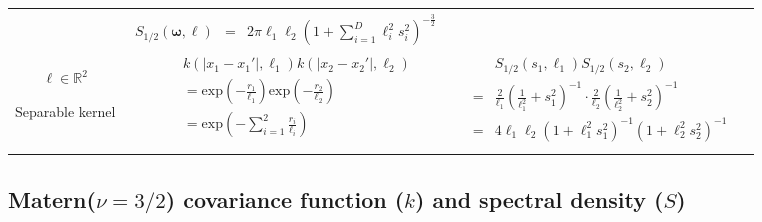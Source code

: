 \documentclass[onecolumn,a4paper,11pt]{article}
\begin{document}
\begin{landscape}
\begin{table}[H]
\begin{center}
\begin{tabular}{|c|c|c|c|}
       & \multicolumn{1}{|p{9.7cm}|}{\small
         \begin{eqnarray*}
		S_{1/2}(\bm{\omega},\bm{\ell}) &=& 2\pi\ell_1\ell_2 \left(1+\sum_{i=1}^{D}\ell_i^2s_{i}^2\right)^{-\frac{3}{2}}
         \end{eqnarray*}
       }
       
       & \multicolumn{1}{|p{5.7cm}|}{\small

       } \\  
       
       \cline{1-3}
       
       \multicolumn{1}{|p{1.5cm}|}{
       \vspace{1mm}
       $\bm{\ell} \in \mathbb{R}^2$
       
       {Separable kernel} 
       }
       
        & \multicolumn{1}{|p{5.7cm}|}{\small
         \begin{eqnarray*}
		&&k(|x_1-x_1'|,\ell_1)k(|x_2-x_2'|,\ell_2) \\
		&&= \mathrm{exp}\left(- \frac{r_1}{\ell_1} \right) \mathrm{exp}\left(- \frac{r_2}{\ell_2} \right) \\
		&&= \mathrm{exp}\left(- \sum_{i=1}^{2}\frac{r_i}{\ell_i} \right)
         \end{eqnarray*}
       }
       
       & \multicolumn{1}{|p{9.7cm}|}{\small
         \begin{eqnarray*}
         &&S_{1/2}(s_1,\ell_1)S_{1/2}(s_2,\ell_2) \\
		&=& \frac{2}{\ell_1}\left(\frac{1}{\ell_1^2}+s_1^2 \right)^{-1} \cdot \frac{2}{\ell_2}\left(\frac{1}{\ell_2^2}+s_2^2 \right)^{-1} \\
		&=& 4\ell_1\ell_2\left(1+\ell_1^2s_1^2 \right)^{-1} \left(1+\ell_2^2s_2^2 \right)^{-1} \\
         \end{eqnarray*}      
       } 

       & \multicolumn{1}{|p{6.7cm}|}{\small

       } \\ 
       
       \hline
    \end{tabular}
  \end{center}
\end{table}


\newpage	
\subsection{Matern($\nu=3/2$) covariance function ($k$) \textbf and spectral density ($S$)}
\vspace{-2mm}

\end{landscape}
\end{document}
